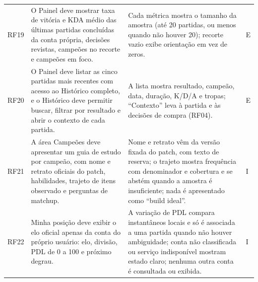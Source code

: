 \documentclass[12pt,a4paper]{article}
\begin{document}
\begin{longtable}{@{}p{1.1cm}p{5.8cm}p{6.4cm}p{1.1cm}@{}}
RF19 & O Painel deve mostrar taxa de vitória e KDA médio das últimas partidas concluídas da conta própria, decisões revistas, campeões no recorte e campeões em foco. & Cada métrica mostra o tamanho da amostra (até 20 partidas, ou menos quando não houver 20); recorte vazio exibe orientação em vez de zeros. & E \\
RF20 & O Painel deve listar as cinco partidas mais recentes com acesso ao Histórico completo, e o Histórico deve permitir buscar, filtrar por resultado e abrir o contexto de cada partida. & A lista mostra resultado, campeão, data, duração, K/D/A e tropas; ``Contexto'' leva à partida e às decisões de compra (RF04). & E \\
RF21 & A área Campeões deve apresentar um guia de estudo por campeão, com nome e retrato oficiais do patch, habilidades, trajeto de itens observado e perguntas de matchup. & Nome e retrato vêm da versão fixada do patch, com texto de reserva; o trajeto mostra frequência com denominador e cobertura e se abstém quando a amostra é insuficiente; nada é apresentado como ``build ideal''. & I \\
RF22 & Minha posição deve exibir o elo oficial apenas da conta do próprio usuário: elo, divisão, PDL de 0 a 100 e próximo degrau. & A variação de PDL compara instantâneos locais e só é associada a uma partida quando não houver ambiguidade; conta não classificada ou serviço indisponível mostram estado claro; nenhuma outra conta é consultada ou exibida. & I \\
\end{longtable}
\normalsize
\end{document}
